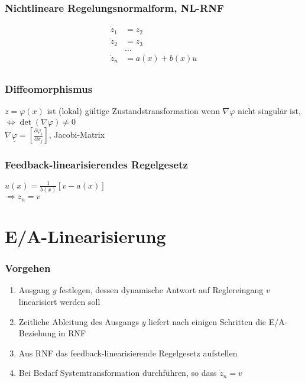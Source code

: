 \documentclass[6pt,a4paper,fleqn]{scrartcl}
\begin{document}
\begin{multicols*}{4}
\subsubsection*{Nichtlineare Regelungsnormalform, NL-RNF}
\begin{align*}
  \dot{z}_1 &= z_2 \\
  \dot{z}_2 &= z_3 \\
            &\dots \\
  \dot{z}_n &= a(x) + b(x) u \\
\end{align*}

\subsubsection*{Diffeomorphismus}
$z = \varphi(x)$ ist (lokal) gültige Zustandstransformation wenn $\nabla \underline{\varphi}$ nicht singulär ist, $\Leftrightarrow \det(\nabla \varphi) \neq 0$ \\
$\nabla \underline{\varphi} = \left[ \frac{\partial \varphi_i}{\partial x_j} \right]$, Jacobi-Matrix

\subsubsection*{Feedback-linearisierendes Regelgesetz}
$u(x) = \frac{1}{b(x)}[v - a(x)]$ \\
$\Rightarrow \dot{z}_n = v $


\section{E/A-Linearisierung}

\subsubsection*{Vorgehen}
\begin{enumerate}
  \item Ausgang $y$ festlegen, dessen dynamische Antwort auf Reglereingang $v$ linearisiert werden soll
  \item Zeitliche Ableitung des Ausgangs $y$ liefert nach einigen Schritten  die E/A-Beziehung in RNF
  \item Aus RNF das feedback-linearisierende Regelgesetz aufstellen
  \item Bei Bedarf Systemtransformation durchführen, so dass $\dot{z}_n = v$
\end{enumerate}


\end{multicols*}
\end{document}
